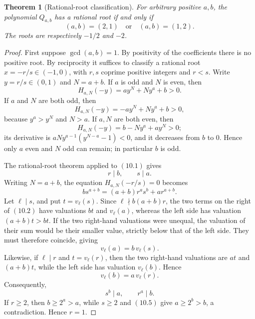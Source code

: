 \documentclass[11pt]{article}
\newtheorem{theorem}{Theorem}[section]
\theoremstyle{definition}
\begin{document}
\begin{theorem}[Rational-root classification]\label{thm:rational}
For arbitrary positive \(a,b\), the polynomial \(Q_{a,b}\) has a rational root
if and only if
\[
 (a,b)=(2,1)\quad\text{or}\quad(a,b)=(1,2).
\]
The roots are respectively \(-1/2\) and \(-2\).
\end{theorem}

\begin{proof}
First suppose \(\gcd(a,b)=1\).  By positivity of the coefficients there is no
positive root.  By reciprocity it suffices to classify a rational root
\(x=-r/s\in(-1,0)\), with \(r,s\) coprime positive integers and \(r<s\).
Write $y=r/s\in(0,1)$ and $N=a+b$.  If \(a\) is odd and \(N\) is even, then
\[
 H_{a,N}(-y)=ay^N+Ny^a+b>0.
\]
If \(a\) and \(N\) are both odd, then
\[
 H_{a,N}(-y)=-ay^N+Ny^a+b>0,
\]
because \(y^a>y^N\) and \(N>a\).  If \(a,N\) are both even, then
\[
 H_{a,N}(-y)=b-Ny^a+ay^N>0;
\]
its derivative is \(aN y^{a-1}(y^{N-a}-1)<0\), and it decreases from
\(b\) to \(0\).  Hence only \(a\) even and \(N\) odd can remain; in
particular \(b\) is odd.

The rational-root theorem applied to \((10.1)\) gives
\[
 r\mid b,\qquad s\mid a.
\]
Writing \(N=a+b\), the equation \(H_{a,N}(-r/s)=0\) becomes
\begin{equation}
 b s^{a+b}=(a+b)r^a s^b+a r^{a+b}.
 \tag{10.2}
\end{equation}
Let \(\ell\mid s\), and put \(t=v_\ell(s)\).  Since
\(\ell\nmid b(a+b)r\), the two terms on the right of \((10.2)\) have
valuations \(bt\) and \(v_\ell(a)\), whereas the left side has valuation
\((a+b)t>bt\).  If the two right-hand valuations were unequal, the
valuation of their sum would be their smaller value, strictly below that of
the left side.  They must therefore coincide, giving
\begin{equation}
 v_\ell(a)=b\,v_\ell(s).
 \tag{10.3}
\end{equation}
Likewise, if \(\ell\mid r\) and \(t=v_\ell(r)\), then the two right-hand
valuations are \(at\) and \((a+b)t\), while the left side has valuation
\(v_\ell(b)\).  Hence
\begin{equation}
 v_\ell(b)=a\,v_\ell(r).
 \tag{10.4}
\end{equation}
Consequently,
\begin{equation}
 s^b\mid a,
 \qquad
 r^a\mid b.
 \tag{10.5}
\end{equation}
If \(r\geq2\), then \(b\geq2^a>a\), while \(s\geq2\) and \((10.5)\) give
\(a\geq2^b>b\), a contradiction.  Hence \(r=1\).


\end{proof}
\end{document}
